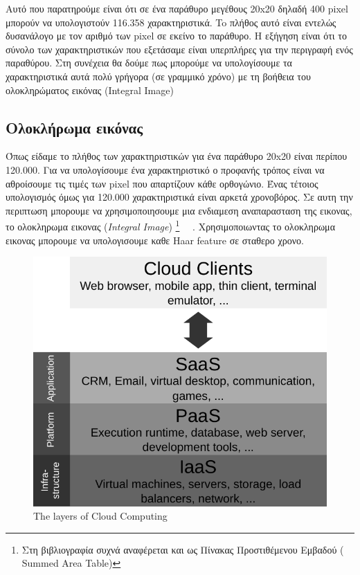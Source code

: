 Αυτό που παρατηρούμε είναι ότι σε ένα παράθυρο μεγέθους 20x20 δηλαδή 400 pixel
μπορούν να υπολογιστούν 116.358 χαρακτηριστικά. To πλήθος αυτό είναι
εντελώς δυσανάλογο με τον αριθμό των pixel σε εκείνο το παράθυρο.
Η εξήγηση είναι ότι το σύνολο των χαρακτηριστικών που εξετάσαμε είναι υπερπλήρες
για την περιγραφή ενός παραθύρου.
Στη συνέχεια θα δούμε πως μπορούμε να υπολογίσουμε τα χαρακτηριστικά αυτά
πολύ γρήγορα (σε γραμμικό χρόνο) με τη βοήθεια του ολοκληρώματος εικόνας (Integral Image)

\subsection{Ολοκλήρωμα εικόνας}

Όπως είδαμε το πλήθος των χαρακτηριστικών για ένα παράθυρο 20x20 είναι περίπου 120.000.
Για να υπολογίσουμε ένα χαρακτηριστικό ο προφανής τρόπος είναι να αθροίσουμε τις
τιμές των pixel που απαρτίζουν κάθε ορθογώνιο. Ένας τέτοιος υπολογισμός όμως για 120.000
χαρακτηριστικά είναι αρκετά χρονοβόρος. Σε αυτη την περιπτωση μπορουμε να χρησιμοποιησουμε
μια ενδιαμεση αναπαρασταση της εικονας, το ολοκληρωμα εικονας (\emph{Integral Image})
\footnote{Στη βιβλιογραφία συχνά αναφέρεται και ως Πίνακας Προστιθέμενου Εμβαδού (
Summed Area Table)}
~\cite{Lienhart02anextended}~\cite{Lienhart2003}.
Χρησιμοποιωντας το ολοκληρωμα εικονας μπορουμε να υπολογισουμε καθε Haar feature
σε σταθερο χρονο.

\begin{figure}[htbp]
  \begin{center}
    \includegraphics[width=1.0\maxwidth]{../figures/cloud_layers-black.pdf}
    \caption{The layers of Cloud Computing\label{fig:cloud_layers}}
   \end{center}
\end{figure}


